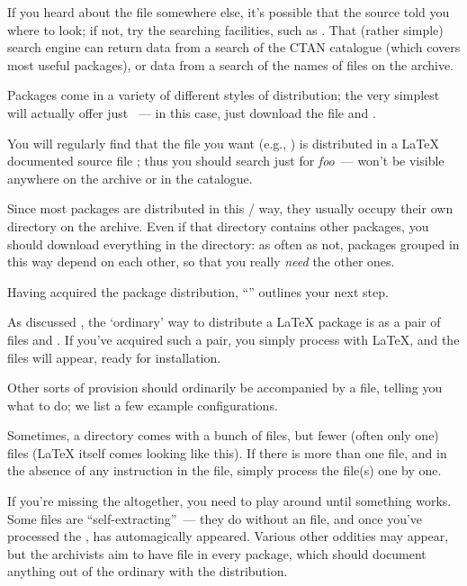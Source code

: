 If you heard about the file somewhere else, it's possible that the
source told you where to look; if not, try the  searching
facilities, such as .  That (rather
simple) search engine can return data from a search of the CTAN
catalogue (which covers most useful packages), or data from a search
of the names of files on the archive.

Packages come in a variety of different styles of distribution; the
very simplest will actually offer just ~--- in this
case, just download the file and %
.

You will regularly find that the file you want (e.g., )
is distributed in a \LaTeX{} documented source file ;
thus you should search just for \emph{foo}~---  won't be
visible anywhere on the archive or in the catalogue.

Since most packages are distributed in this
/ way, they usually occupy their own
directory on the archive.  Even if that directory contains other
packages, you should download everything in the directory: as often as
not, packages grouped in this way depend on each other, so that you
really \emph{need} the other ones.

Having acquired the package distribution, %
``'' outlines
your next step.


As discussed , the `ordinary' way to
distribute a \LaTeX{} package is as a pair of files 
and .  If you've acquired such a pair, you simply
process  with \LaTeX{}, and the files will appear,
ready for installation.

Other sorts of provision should ordinarily be accompanied by a
 file, telling you what to do; we list a few example
configurations.

Sometimes, a directory comes with a bunch of  files, but
fewer (often only one)  files (\LaTeX{} itself comes
looking like this).  If there is more than one  file,
and in the absence of any instruction in the  file, simply
process the  file(s) one by one.

If you're missing the  altogether, you need to play
around until something works.  Some  files are
``self-extracting''~--- they do without an  file, and once
you've processed the ,  has
automagically appeared.  Various other oddities may appear, but the
archivists aim to have  file in every package, which
should document anything out of the ordinary with the distribution.

